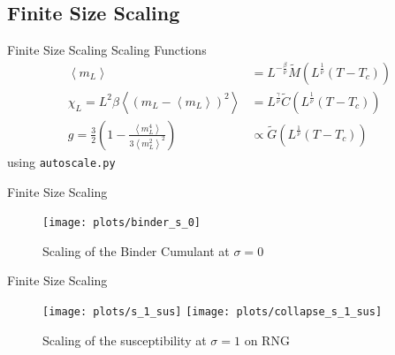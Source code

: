 \documentclass{beamer}
\newcommand{\brac}[1]{\ensuremath{\left(#1\right)}}
\newcommand{\avg}[1]{\left< #1 \right>}
\begin{document}
    \subsection{Finite Size Scaling}
        \begin{frame}{Finite Size Scaling}
            Scaling Functions
            \begin{align}
                \label{eq:fsscaling:m}
                \avg{m_L} &= L^{-\frac{\beta}{\nu}} \tilde{M}\brac{L^\frac{1}{\nu}\brac{T-T_c}}\\
                \label{eq:fsscaling:chi}
                \chi_L    = L^{2} \beta \avg{\brac{m_{L}-\avg{m_{L}}}^2} &= L^{\frac{\gamma}{\nu}} \tilde{C}\brac{L^\frac{1}{\nu}\brac{T-T_c}}\\
                \label{eq:fsscaling:g}
                g         = \frac{3}{2}\brac{1-\frac{\avg{m_{L}^4}}{3\avg{m_{L}^2}^2}} &\propto \tilde{G}\brac{L^\frac{1}{\nu}\brac{T-T_c}}
            \end{align}
            using \texttt{autoscale.py} \cite{autoscale2009}
        \end{frame}
        \begin{frame}{Finite Size Scaling}
            \begin{figure}[htbp]
                \centering
                \subfigure
                {
                    \label{sfig:gettingCrit:binder_s_0}
                    \texttt{[image: plots/binder\_s\_0]}
                }
                \caption
                {
                    Scaling of the Binder Cumulant at \(\sigma = 0\)
                }
                \label{fig:gettingCrit}
            \end{figure}
        \end{frame}
        \begin{frame}{Finite Size Scaling}
            \begin{figure}[htbp]
                \centering
                \subfigure
                {
                    \label{sfig:gettingCrit:s_1_sus}
                    \texttt{[image: plots/s\_1\_sus]}
                }
                \subfigure
                {
                    \label{sfig:gettingCrit:collapse_s_1_sus}
                    \texttt{[image: plots/collapse\_s\_1\_sus]}
                }
                \caption
                {
                    Scaling of the susceptibility at \(\sigma = 1\) on RNG
                }
                \label{fig:gettingCrit}
            \end{figure}
        \end{frame}
\end{document}
